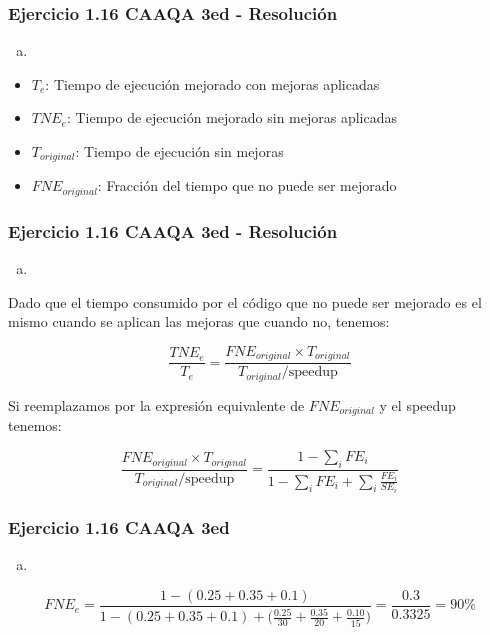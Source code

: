 \documentclass{beamer}
\begin{document}
\begin{frame}
\frametitle{Ejercicio 1.16 CAAQA 3ed - Resolución}

\begin{enumerate}[b.]
\item
\end{enumerate}

\begin{itemize}
\item $T_e$: Tiempo de ejecución mejorado con mejoras aplicadas
\item $TNE_e$: Tiempo de ejecución mejorado sin mejoras aplicadas
\item $T_{original}$: Tiempo de ejecución sin mejoras
\item $FNE_{original}$: Fracción del tiempo que no puede ser mejorado
\end{itemize}

\end{frame}

\begin{frame}
\frametitle{Ejercicio 1.16 CAAQA 3ed - Resolución}

\begin{enumerate}[b.]
\item
\end{enumerate}

Dado que el tiempo consumido por el código que no puede ser mejorado es el mismo cuando se aplican las mejoras que cuando no, tenemos:

\[ \frac{TNE_e}{T_e} = \frac{FNE_{original} \times T_{original}}{T_{original} / \text{speedup}} \]

Si reemplazamos por la expresión equivalente de $FNE_{original}$ y el speedup tenemos:

\[\frac{FNE_{original} \times T_{original}}{T_{original} / \text{speedup}}  = \frac{1 - \sum_i FE_i}{ 1 - \sum_i FE_i + \sum_i \frac{FE_i} {SE_i}}\]

\end{frame}

\begin{frame}
\frametitle{Ejercicio 1.16 CAAQA 3ed}
\begin{enumerate}[b.]
\item
\end{enumerate}
\bigskip
\[ FNE_e = \frac{1 - (0.25 + 0.35 + 0.1)}{1 - (0.25 + 0.35 + 0.1) + \big(\frac{0.25}{30}+\frac{0.35}{20}+\frac{0.10}{15}\big)} = \frac{0.3}{0.3325}  = 90\%\]
\end{frame}
\end{document}
